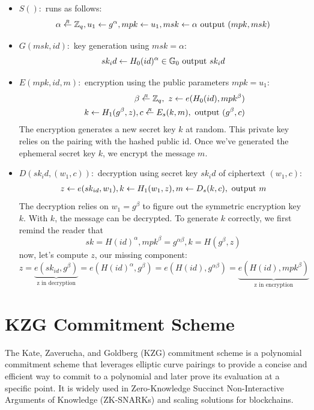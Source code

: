 \begin{itemize}
  \item $S():$ runs as follows:
  $$ \alpha\overset{_R}{\leftarrow} \mathbb{Z}_q, u_1\leftarrow g^\alpha, mpk \leftarrow u_1, msk \leftarrow \alpha 
  \text{ output }(mpk,msk) $$
  \item $G(msk,id):$ key generation using $msk = \alpha$:
  $$ sk_id \leftarrow H_0(id)^\alpha \in \mathbb{G}_0 \text{ output } sk_id$$
  \item $E(mpk, id, m ):$ encryption using the public parameters $mpk=u_1$:
  \begin{align*}
    \beta \getrandom \Z_q,\  z\from e(H_0(id),mpk^\beta) 
    \\ \ 
    k\from H_1(g^\beta,z), c\getrandom E_s(k,m), \text{ output } (g^\beta,c)
  \end{align*}
  The encryption generates a new secret key $k$ at random. This private key relies on the pairing with
  the hashed public id. Once we've generated the ephemeral secret key $k$, we encrypt the message $m$.

  \item $D(sk_id,(w_1,c)):$ decryption using secret key $sk_id$ of ciphertext $(w_1,c)$:
  \begin{align*}
    z \leftarrow  e(sk_{id},w_1), k\leftarrow H_1(w_1, z), m\leftarrow D_s(k,c),
  \text{ output } m
  \end{align*}
  The decryption relies on $w_1=g^\beta$ to figure out the symmetric encryption key $k$.
  With $k$, the message can be decrypted.
  \newline
  To generate $k$ correctly, we first remind the reader that $$sk=H(id)^\alpha, mpk^\beta=g^{\alpha\beta}, k=H(g^\beta,z)$$
  now, let's compute $z$, our missing component:
  $$
  z=\underbrace{e(sk_{id},g^\beta)}_{\text{z in decryption}}=e(H(id)^\alpha,g^\beta)=e(H(id),g^{\alpha\beta})=\underbrace{e(H(id),mpk^\beta)}_{\text{z in encryption}}
  $$
\end{itemize}

\section{KZG Commitment Scheme}
The Kate, Zaverucha, and Goldberg (KZG) commitment scheme is a polynomial commitment scheme that leverages elliptic curve pairings to provide a concise and efficient way to commit to a polynomial and later prove its evaluation at a specific point. It is widely used in Zero-Knowledge Succinct Non-Interactive Arguments of Knowledge (ZK-SNARKs) and scaling solutions for blockchains.

